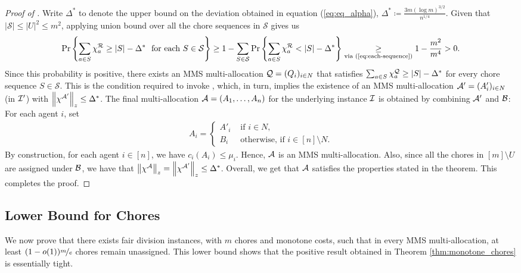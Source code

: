 \begin{proof}[Proof of ]
    
    Write $\Delta^*$ to denote the upper bound on the deviation obtained in equation (\ref{eq:eq_alpha}), $\Delta^* \coloneqq \frac{3m \left(\log  m\right)^{3/2}}{n^{1/4}}$. Given that $|\mathcal{S}| \leq |U|^2\leq m^2$, applying union bound over all the chore sequences in $\mathcal{S}$ gives us  
    \begin{align*}
        \Pr \left\{ \sum_{a\in S} \chi^{\mathcal{R}}_a \geq |S|-\Delta^*  \ \text{ for each } S\in\mathcal{S}\right\}
    \geq 1 - \sum_{S \in \mathcal{S}} \Pr \left\{\sum_{a \in S} \chi^{\mathcal{R}}_a < |S|-\Delta^*\right\} \underset{\text{via (\ref{eq:each-sequence})}}{\geq} 
    1-\frac{m^2}{m^4}>0.
    \end{align*}
    Since this probability is positive, there exists an MMS multi-allocation $\mathcal{Q}=(Q_i)_{i\in N}$ that satisfies $\sum_{a\in S} \chi^{\mathcal{Q}}_a \geq |S|-\Delta^*$ for every chore sequence $S \in \mathcal{S}$. This is the condition required to invoke , which, in turn, implies the existence of an MMS multi-allocation $\mathcal{A}'=(A'_i)_{i\in N}$ (in $\mathcal{I}'$) with $\left\|\chi^{\mathcal{A}'}\right\|_z\leq \Delta^*$. The final multi-allocation $\mathcal{A}=(A_1,\ldots,A_n)$ for the underlying instance $\mathcal{I}$ is obtained by combining $\mathcal{A}'$ and $\mathcal{B}$: For each agent $i$, set 
    \begin{align*}
        A_i=\begin{cases}
        A'_i & \text{ if }i\in N,\\
        B_i &\text{ otherwise, if $i \in [n] \setminus N$}.
    \end{cases}
    \end{align*}
    By construction, for each agent $i \in [n]$, we have $c_i(A_i) \leq \mu_i$. Hence, $\mathcal{A}$ is an MMS multi-allocation. Also, since all the chores in $[m] \setminus U$ are assigned under $\mathcal{B}$, we have that $\left\|\chi^{\mathcal{A}}\right\|_z = \left\|\chi^{\mathcal{A}'}\right\|_z \leq \Delta^*$. Overall, we get that $\mathcal{A}$ satisfies the properties stated in the theorem. This completes the proof.  
    \end{proof}
       

    \subsection{Lower Bound for Chores}

    We now prove that there exists fair division instances, with $m$ chores and monotone costs, such that in every MMS multi-allocation, at least $(1- o(1))\nicefrac{m}{e}$ chores remain unassigned. This lower bound shows that the positive result obtained in Theorem \ref{thm:monotone_chores} is essentially tight. 

